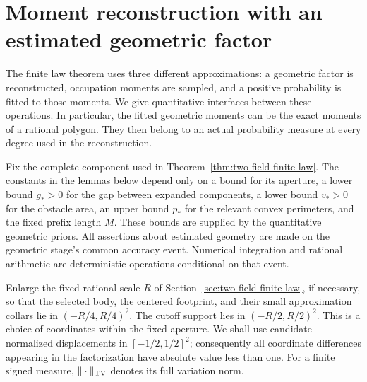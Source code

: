 \section{Moment reconstruction with an estimated geometric factor}
\label{sec:moment-factor-details}
The finite law theorem uses three different approximations: a geometric
factor is reconstructed, occupation moments are sampled, and a positive
probability is fitted to those moments.  We give quantitative interfaces
between these operations.  In particular, the fitted geometric moments
can be the exact moments of a rational polygon.  They then belong to an
actual probability measure at every degree used in the reconstruction.

Fix the complete component used in
Theorem~\ref{thm:two-field-finite-law}.  The constants in the lemmas below
depend only on a bound for its aperture, a lower bound $g_*>0$ for the
gap between expanded components, a lower bound $v_*>0$ for the obstacle
area, an upper bound $p_*$ for the relevant convex perimeters, and the
fixed prefix length $M$.  These bounds are supplied by the quantitative
geometric priors.  All assertions about estimated geometry are made on
the geometric stage's common accuracy event.  Numerical integration and
rational arithmetic are deterministic operations conditional on that
event.

Enlarge the fixed rational scale $R$ of
Section~\ref{sec:two-field-finite-law}, if necessary, so that the selected
body, the centered footprint, and their small approximation collars lie
in $(-R/4,R/4)^2$.  The cutoff support lies in $(-R/2,R/2)^2$.
This is a choice of coordinates within the fixed aperture.  We shall use
candidate normalized displacements in $[-1/2,1/2]^2$; consequently all
coordinate differences appearing in the factorization have absolute
value less than one.  For a finite signed measure, $\|\cdot\|_{\rm TV}$
denotes its full variation norm.

